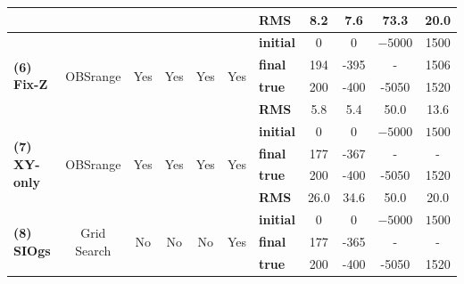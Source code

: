 \documentclass[10pt,titlepage]{article}
\begin{document}
\begin{table}
{\begin{tabular}{l | c c c c c | l c c c c}
\multirow{4}{*}{} & \multirow{4}{*}{} & \multirow{4}{*}{} & \multirow{4}{*}{} & \multirow{4}{*}{} & \multirow{4}{*}{} & \textbf{RMS} & 8.2 & 7.6 & 73.3 & 20.0 \\ 
\hline
\multirow{4}{*}{\textbf{(6) Fix-Z}} & \multirow{4}{*}{OBSrange} & \multirow{4}{*}{Yes} & \multirow{4}{*}{Yes} & \multirow{4}{*}{Yes} & \multirow{4}{*}{Yes} & \textbf{initial} & 0 & 0 & $\mathit{-5000}$ & 1500 \\ 
\multirow{4}{*}{} & \multirow{4}{*}{} & \multirow{4}{*}{} & \multirow{4}{*}{} & \multirow{4}{*}{} & \multirow{4}{*}{} & \textbf{final}& 194 & -395 & - & 1506 \\ 
\multirow{4}{*}{} & \multirow{4}{*}{} & \multirow{4}{*}{} & \multirow{4}{*}{} & \multirow{4}{*}{} & \multirow{4}{*}{} & \textbf{true}& 200 & -400 & -5050 & 1520 \\ 
\multirow{4}{*}{} & \multirow{4}{*}{} & \multirow{4}{*}{} & \multirow{4}{*}{} & \multirow{4}{*}{} & \multirow{4}{*}{} & \textbf{RMS} & 5.8 & 5.4 & 50.0 & 13.6 \\ 
\hline
\multirow{4}{*}{\textbf{(7) XY-only}} & \multirow{4}{*}{OBSrange} & \multirow{4}{*}{Yes} & \multirow{4}{*}{Yes} & \multirow{4}{*}{Yes} & \multirow{4}{*}{Yes} & \textbf{initial} & 0 & 0 & $\mathit{-5000}$ & $\mathit{1500}$ \\ 
\multirow{4}{*}{} & \multirow{4}{*}{} & \multirow{4}{*}{} & \multirow{4}{*}{} & \multirow{4}{*}{} & \multirow{4}{*}{} & \textbf{final}& 177 & -367 & - & - \\ 
\multirow{4}{*}{} & \multirow{4}{*}{} & \multirow{4}{*}{} & \multirow{4}{*}{} & \multirow{4}{*}{} & \multirow{4}{*}{} & \textbf{true}& 200 & -400 & -5050 & 1520 \\ 
\multirow{4}{*}{} & \multirow{4}{*}{} & \multirow{4}{*}{} & \multirow{4}{*}{} & \multirow{4}{*}{} & \multirow{4}{*}{} & \textbf{RMS} & 26.0 & 34.6 & 50.0 & 20.0 \\ 
\hline
\multirow{4}{*}{\textbf{(8) SIOgs}} & \multirow{4}{*}{Grid Search} & \multirow{4}{*}{No} & \multirow{4}{*}{No} & \multirow{4}{*}{No} & \multirow{4}{*}{Yes} & \textbf{initial} & 0 & 0 & $\mathit{-5000}$ & $\mathit{1500}$ \\ 
\multirow{4}{*}{} & \multirow{4}{*}{} & \multirow{4}{*}{} & \multirow{4}{*}{} & \multirow{4}{*}{} & \multirow{4}{*}{} & \textbf{final}& 177 & -365 & - & - \\ 
\multirow{4}{*}{} & \multirow{4}{*}{} & \multirow{4}{*}{} & \multirow{4}{*}{} & \multirow{4}{*}{} & \multirow{4}{*}{} & \textbf{true}& 200 & -400 & -5050 & 1520 \\ 

\end{tabular}}
\end{table}
\end{document}
